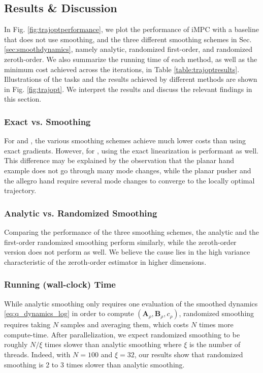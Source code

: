 
\subsection{Results \& Discussion}
In Fig. \ref{fig:trajoptperformance}, we plot the performance of iMPC with a baseline that does not use smoothing, and the three different smoothing schemes in Sec. \ref{sec:smoothdynamics}, namely analytic, randomized first-order, and randomized zeroth-order. We also summarize the running time of each method, as well as the minimum cost achieved across the iterations, in Table \ref{table:trajoptresults}. Illustrations of the tasks and the results achieved by different methods are shown in Fig. \ref{fig:trajopt}. We interpret the results and discuss the relevant findings in this section. 
\subsubsection{Exact vs. Smoothing} For  and , the various smoothing schemes achieve much lower costs than using exact gradients. However, for , using the exact linearization is performant as well. This difference may be explained by the observation that the planar hand example does not go through many mode changes, while the planar pusher and the allegro hand require several mode changes to converge to the locally optimal trajectory. 

\subsubsection{Analytic vs. Randomized Smoothing} Comparing the performance of the three smoothing schemes, the analytic and the first-order randomized smoothing perform similarly, while the zeroth-order version does not perform as well. We believe the cause lies in the high variance characteristic of the zeroth-order estimator in higher dimensions.


\subsubsection{Running (wall-clock) Time} While analytic smoothing only requires one evaluation of the smoothed dynamics \eqref{eq:q_dynamics_log} in order to compute $(\mathbf{A}_\rho,\mathbf{B}_\rho,c_\rho)$, randomized smoothing requires taking $N$ samples and averaging them, which costs $N$ times more compute-time. After parallelization, we expect randomized smoothing to be roughly $N/\xi$ times slower than analytic smoothing where $\xi$ is the number of threads. Indeed, with $N=100$ and $\xi=32$, our results show that randomized smoothing is 2 to 3 times slower than analytic smoothing.



